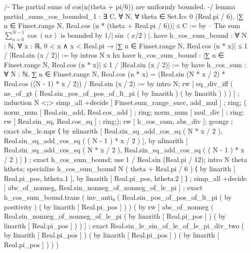 /-
The partial sums of cos(n(theta + pi/6)) are uniformly bounded.
-/
lemma partial_sums_cos_bounded_1 :
  ∃ C, ∀ N, ∀ theta ∈ Set.Icc 0 (Real.pi / 6), |∑ n ∈ Finset.range N, Real.cos (n * (theta + Real.pi / 6))| ≤ C := by
    -- The sum $\sum_{n=0}^{N-1} \cos(nx)$ is bounded by $1/|\sin(x/2)|$.
    have h_cos_sum_bound : ∀ N : ℕ, ∀ x : ℝ, 0 < x ∧ x < Real.pi → |∑ n ∈ Finset.range N, Real.cos (n * x)| ≤ 1 / |Real.sin (x / 2)| := by
      intros N x hx
      have h_cos_sum_bound : |∑ n ∈ Finset.range N, Real.cos (n * x)| ≤ 1 / |Real.sin (x / 2)| := by
        have h_cos_sum : ∀ N : ℕ, ∑ n ∈ Finset.range N, Real.cos (n * x) = (Real.sin (N * x / 2) * Real.cos ((N - 1) * x / 2)) / Real.sin (x / 2) := by
          intro N; rw [ eq_div_iff ( ne_of_gt ( Real.sin_pos_of_pos_of_lt_pi ( by linarith ) ( by linarith ) ) ) ] ; induction N <;> simp_all +decide [ Finset.sum_range_succ, add_mul ] ; ring; (
          norm_num [ Real.sin_add, Real.cos_add ] ; ring; norm_num [ mul_div ] ; ring;
          rw [ Real.sin_sq, Real.cos_sq ] ; ring;);
        rw [ h_cos_sum, abs_div ];
        gcongr ; exact abs_le.mpr ⟨ by nlinarith [ Real.sin_sq_add_cos_sq ( N * x / 2 ), Real.sin_sq_add_cos_sq ( ( N - 1 ) * x / 2 ) ], by nlinarith [ Real.sin_sq_add_cos_sq ( N * x / 2 ), Real.sin_sq_add_cos_sq ( ( N - 1 ) * x / 2 ) ] ⟩ ;
      exact h_cos_sum_bound;
    use 1 / Real.sin (Real.pi / 12);
    intro N theta htheta; specialize h_cos_sum_bound N ( theta + Real.pi / 6 ) ⟨ by linarith [ Real.pi_pos, htheta.1 ], by linarith [ Real.pi_pos, htheta.2 ] ⟩ ; simp_all +decide [ abs_of_nonneg, Real.sin_nonneg_of_nonneg_of_le_pi ] ;
    exact h_cos_sum_bound.trans ( inv_anti₀ ( Real.sin_pos_of_pos_of_lt_pi ( by positivity ) ( by linarith [ Real.pi_pos ] ) ) ( by rw [ abs_of_nonneg ( Real.sin_nonneg_of_nonneg_of_le_pi ( by linarith [ Real.pi_pos ] ) ( by linarith [ Real.pi_pos ] ) ) ] ; exact Real.sin_le_sin_of_le_of_le_pi_div_two ( by linarith [ Real.pi_pos ] ) ( by linarith [ Real.pi_pos ] ) ( by linarith [ Real.pi_pos ] ) ) )

